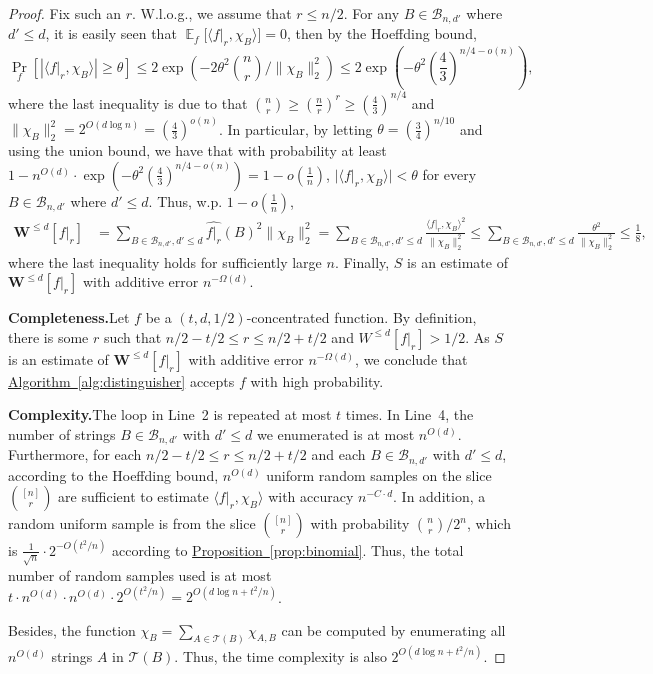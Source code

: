 \documentclass[11pt]{article}
\numberwithin{equation}{section}
\theoremstyle{definition}
\theoremstyle{plain}
\newcommand{\expref}[2]{\hyperref[#2]{#1~\ref{#2}}}
\DeclareMathOperator*{\E}{\mathbb{E}}
\newcommand{\Braket}[1]{\langle#1\rangle}
\newcommand{\W}{\mathbf{W}}
\begin{document}
\begin{proof}
Fix such an $r$. W.l.o.g., we assume that $r\leq n/2$. For any $B\in\mathcal{B}_{n,d'}$ where $d'\leq d$, it is easily seen that $\E_f\big[\Braket{f|_r, \chi_B}\big]=0$, then by the Hoeffding bound,
%
\begin{equation} %
    \Pr_f\left[\left|\Braket{f|_r, \chi_B}\right|\ge \theta\right]\leq 2 \exp\left(-2\theta^2 
    \binom{n}{r} %
    \big/ \|\chi_B\|^2_2\right)\leq 2\exp\left(-\theta^2 \left(\frac{4}{3}\right)^{n/4-o(n)}\right),
%
\end{equation} %
where the last inequality is due to that %
$\binom{n}{r} %
\geq (\frac{n}{r})^r \geq (\frac{4}{3})^{n/4}$ and $\|\chi_B\|^2_2=2^{O(d\log n)}=(\frac{4}{3})^{o(n)}$.
In particular, by letting $\theta=\left(\frac{3}{4}\right)^{n/10}$ and using the union bound, we have that with probability at least $1-n^{O(d)}\cdot \exp\left(-\theta^2 \left(\frac{4}{3}\right)^{n/4-o(n)}\right)=1-o(\frac{1}{n})$, $\big|\Braket{f|_r, \chi_B}\big|< \theta$ for every $B\in\mathcal{B}_{n,d'}$ where $d'\leq d$. Thus, w.p. $1-o(\frac{1}{n})$,
%
\begin{align} %
    \W^{\leq d}[f|_r]&=\sum_{B\in\mathcal{B}_{n,d'},d'\leq d} \widehat{f|_r}(B)^2\|\chi_B\|_2^2=\sum_{B\in\mathcal{B}_{n,d'},d'\leq d} \frac{\Braket{f|_r, \chi_B}^2}{\|\chi_B\|_2^2}
 \leq \sum_{B\in\mathcal{B}_{n,d'},d'\leq d} \frac{\theta^2}{\|\chi_B\|_2^2}\leq \frac{1}{8},
%
\end{align} %
where the last inequality holds for sufficiently large $n$. Finally, $S$ is an estimate of $\W^{\leq d}[f|_r]$ with additive error $n^{-\Omega(d)}$.

\vspace{2ex}
\noindent\textbf{Completeness.}\quad Let $f$ be a $(t,d,1/2)$-concentrated function. By definition, there is some $r$ such that $n/2-t/2\leq r\leq n/2+t/2$ and $W^{\leq d}[f|_r]>1/2$. As $S$ is an estimate of $\W^{\leq d}[f|_r]$ with additive error $n^{-\Omega(d)}$, we conclude that \expref{Algorithm}{alg:distinguisher} accepts $f$ with high probability.

\vspace{2ex}
\noindent\textbf{Complexity.}\quad The loop in Line~2 is repeated at most $t$ times. In Line~4, the number of strings 
%
$B\in \mathcal{B}_{n,d'}$ with $d'\leq d$ %
we enumerated is at most $n^{O(d)}$.
Furthermore, for each $n/2-t/2\leq r\leq n/2+t/2$ and each 
%
$B\in\mathcal{B}_{n,d'}$ with $d'\leq d$, 
according to the Hoeffding bound, $n^{O(d)}$ uniform random samples on the slice 
%
$\binom{[n]}{r}$ %
are sufficient to estimate $\Braket{f|_r, \chi_B}$ with accuracy $n^{-C\cdot d}$. In addition, a random uniform sample is from the slice 
%
$\binom{[n]}{r}$ %
with probability 
%
$\binom{n}{r}/2^n$, %
which is $\frac{1}{\sqrt{n}}\cdot2^{-O(t^2/n)}$ according to \expref{Proposition}{prop:binomial}. Thus, the total number of random samples used is at most $t \cdot n^{O(d)}\cdot n^{O(d)}\cdot 2^{O(t^2/n)}=2^{O(d\log n+t^2/n)}$.

Besides, the function 
%
$\chi_B=\sum_{A\in \mathcal{T}(B)}\chi_{A,B}$ %
can be computed by enumerating all $n^{O(d)}$ strings $A$ in 
%
$\mathcal{T}(B)$. %
Thus, the time complexity is also $2^{O(d\log n + t^2/n)}$.
\end{proof}
\end{document}
